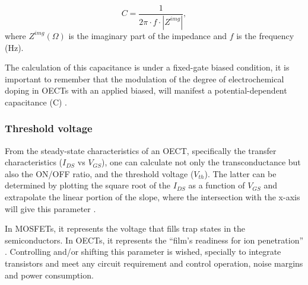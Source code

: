 \begin{equation} \label{eq:C}
	C = \frac{1}{2\pi \cdot f \cdot |Z^{img}|},
\end{equation}
where $Z^{img} (\Omega)$ is the imaginary part of the impedance and $f$ is the frequency (Hz).

The calculation of this capacitance is under a fixed-gate biased condition, it is important to remember that the modulation of the degree of electrochemical doping in OECTs with an applied biased, will manifest a potential-dependent capacitance (C)%
\cite{inalBenchmarkingOrganicMixed2017}.

\subsubsection{Threshold voltage}

From the steady-state characteristics of an OECT, specifically the transfer characteristics ($I_{DS}$ vs $V_{GS}$), one can calculate not only the transconductance but also the ON/OFF ratio, and the threshold voltage ($V_{th}$). The latter can be determined by plotting the square root of the $I_{DS}$ as a function of $V_{GS}$ and extrapolate the linear portion of the slope, where the intersection with the x-axis will give this parameter \cite{ohayonGuideCharacterizationOrganic2023}.

In MOSFETs, it represents the voltage that fills trap states in the semiconductors. In OECTs, it represents the ``film's readiness for ion penetration'' \cite{ohayonGuideCharacterizationOrganic2023}. Controlling and/or shifting this parameter is wished, specially to integrate transistors and meet any circuit requirement and control operation, noise margins and power consumption. 

